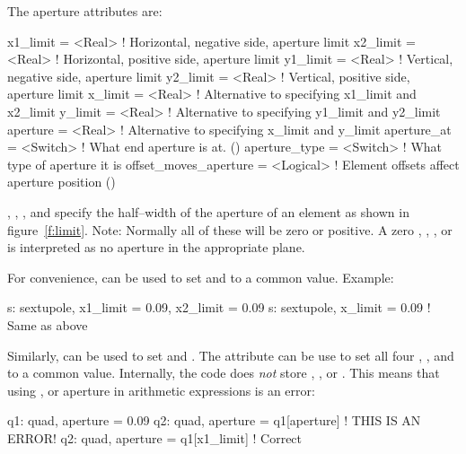 The aperture attributes are:
\begin{example}
  x1_limit      = <Real>      ! Horizontal, negative side, aperture limit
  x2_limit      = <Real>      ! Horizontal, positive side, aperture limit
  y1_limit      = <Real>      ! Vertical, negative side, aperture limit
  y2_limit      = <Real>      ! Vertical, positive side, aperture limit
  x_limit       = <Real>      ! Alternative to specifying x1_limit and x2_limit
  y_limit       = <Real>      ! Alternative to specifying y1_limit and y2_limit
  aperture      = <Real>      ! Alternative to specifying x_limit and y_limit
  aperture_at   = <Switch>    ! What end aperture is at. ()
  aperture_type = <Switch>    ! What type of aperture it is
  offset_moves_aperture = <Logical> ! Element offsets affect aperture position ()
\end{example}
, , , and  specify the half--width of the
aperture of an element as shown in figure~\ref{f:limit}. Note: Normally all of these will be zero or
positive. A zero , , , or  is interpreted as no
aperture in the appropriate plane.

For convenience,  can be used to set  and
 to a common value. Example:
\begin{example}
  s: sextupole, x1_limit = 0.09, x2_limit = 0.09
  s: sextupole, x_limit = 0.09   ! Same as above
\end{example}
Similarly,  can be used
to set  and .  The  attribute
can be use to set all four , , 
and  to a common value. Internally, the \bmad code does {\em not}
store , , or . This means that
using ,  or aperture in arithmetic expressions is
an error:
\begin{example}
  q1: quad, aperture = 0.09         
  q2: quad, aperture = q1[aperture]   ! THIS IS AN ERROR!
  q2: quad, aperture = q1[x1_limit]   ! Correct
\end{example}

